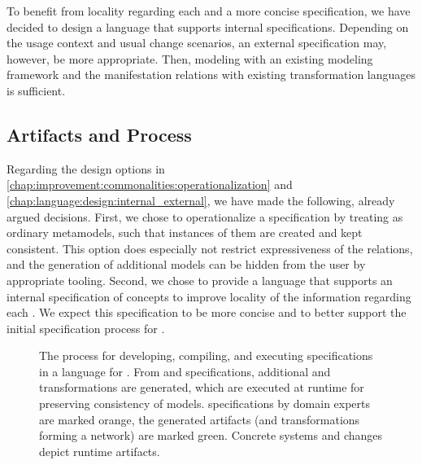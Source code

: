 To benefit from locality regarding each \commonality and a more concise specification, we have decided to design a language that supports internal specifications.
Depending on the usage context and usual change scenarios, an external specification may, however, be more appropriate.
Then, modeling \concretemetamodels with an existing modeling framework and the manifestation relations with existing transformation languages is sufficient.


\subsection{Artifacts and Process}
\label{chap:language:design:artifacts_process}

Regarding the design options in \autoref{chap:improvement:commonalities:operationalization} and \autoref{chap:language:design:internal_external}, we have made the following, already argued decisions.
First, we chose to operationalize a specification by treating \conceptmetamodels as ordinary metamodels, such that instances of them are created and kept consistent.
This option does especially not restrict expressiveness of the relations, and the generation of additional models can be hidden from the user by appropriate tooling.
Second, we chose to provide a language that supports an internal specification of concepts to improve locality of the information regarding each \commonality.
We expect this specification to be more concise and to better support the initial specification process for \commonalities.

\begin{figure}
    \centering
    
    \caption[Process and artifacts using a language for \commonalities]{The process for developing, compiling, and executing specifications in a language for \commonalities. From \concretemetamodels and \commonalities specifications, additional \conceptmetamodels and transformations are generated, which are executed at runtime for preserving consistency of models.
    \Commonalities specifications by domain experts are marked orange, the generated artifacts (\conceptmetamodels and transformations forming a network) are marked green. Concrete systems and changes depict runtime artifacts.}
    \label{fig:language:process}
\end{figure}

